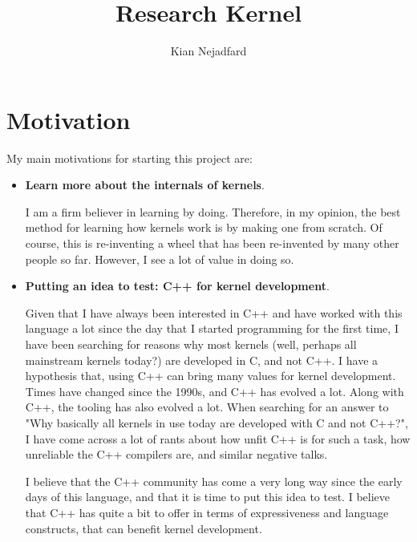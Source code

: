 \documentclass[a4paper,12pt,twoside]{book}
\title{Research Kernel}
\author{Kian Nejadfard}
\begin{document}
    \maketitle
    
    \section*{Motivation}
        My main motivations for starting this project are:
        \begin{itemize}
            \item \textbf{Learn more about the internals of kernels}.
            
            I am a firm believer in learning by doing. Therefore, in my opinion, the best method for learning how kernels work is by making one from scratch. Of course, this is re-inventing a wheel that has been re-invented by many other people so far. However, I see a lot of value in doing so.
            \item \textbf{Putting an idea to test: C++ for kernel development}.
            
            Given that I have always been interested in C++ and have worked with this language a lot since the day that I started programming for the first time, I have been searching for reasons why most kernels (well, perhaps all mainstream kernels today?) are developed in C, and not C++. I have a hypothesis that, using C++ can bring many values for kernel development. Times have changed since the 1990s, and C++ has evolved a lot. Along with C++, the tooling has also evolved a lot. When searching for an answer to "Why basically all kernels in use today are developed with C and not C++?", I have come across a lot of rants about how unfit C++ is for such a task, how unreliable the C++ compilers are, and similar negative talks.
            
            I believe that the C++ community has come a very long way since the early days of this language, and that it is time to put this idea to test. I believe that C++ has quite a bit to offer in terms of expressiveness and language constructs, that can benefit kernel development. 
        \end{itemize}
\end{document}
